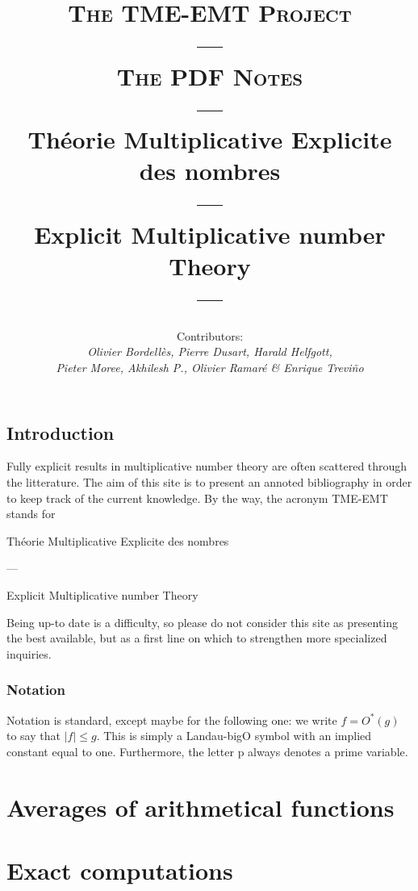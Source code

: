 \documentclass[10pt,twoside, svgnames]{book}
\title{{\textsc{\Huge The TME-EMT Project
         \\---\\[1ex]
      The PDF Notes\\[2ex]
       ---}}\\[1ex]
       {\huge Th\'eorie Multiplicative Explicite des nombres
         \\ ---\\[1ex]
         Explicit Multiplicative number Theory
         }
     \\[1ex]
       ---}
\author{Contributors:\\ {\sl Olivier Bordell\`es, Pierre Dusart,
    Harald Helfgott,} \\ {\sl Pieter
  Moree, Akhilesh P.,  Olivier Ramar\'e \& Enrique Trevi\~no}}
\begin{document}
\frontmatter
\maketitle


\mainmatter
\chapter*{Introduction}

Fully explicit results in multiplicative number theory are often
scattered through the litterature. The aim of this site is to present
an annoted bibliography in order to keep track of the current
knowledge. By the way, the acronym TME-EMT stands for 
\begin{center}
    Th\'eorie Multiplicative Explicite des nombres  

    ---

    Explicit
    Multiplicative number Theory 
\end{center}

Being up-to date is a difficulty, so please do not consider this site
as presenting the best available, but as a first line on which to
strengthen more specialized inquiries.

  {\small \tableofcontents\par}

\vfill
\section*{Notation}

Notation is standard, except maybe for the following one: we write
$f=O^*(g)$ to say that $|f|\le g$. This is simply a Landau-bigO symbol
with an implied constant equal to one. Furthermore, the letter p
always denotes a prime variable.

\part{Averages of arithmetical functions}







\part{Exact computations}
\end{document}
